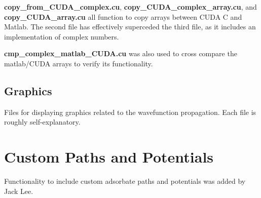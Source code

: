 \documentclass[11pt,letterpaper]{article}
\renewcommand{\\}{\bigskip}
\begin{document}
\textbf{copy\_from\_CUDA\_complex.cu}, \textbf{copy\_CUDA\_complex\_array.cu}, and \textbf{copy\_CUDA\_array.cu} all function to copy arrays between CUDA C and Matlab. The second file has effectively superceded the third file, as it includes an implementation of complex numbers.\\

\textbf{cmp\_complex\_matlab\_CUDA.cu} was also used to cross compare the matlab/CUDA arrays to verify its functionality.\\


\subsection{Graphics}\\

Files for displaying graphics related to the wavefunction propagation. Each file is roughly self-explanatory.\\

\label{sec:custompaths}
\section{Custom Paths and Potentials}
Functionality to include custom adsorbate paths and potentials was added by Jack Lee.
\end{document}
